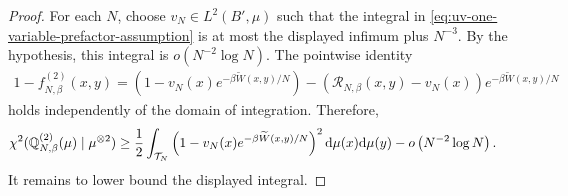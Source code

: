 \documentclass[11pt,reqno]{amsart}
\numberwithin{equation}{section}
\theoremstyle{plain}
\theoremstyle{remark}
\DeclarePairedDelimiter{\pa}{\lparen}{\rparen}
\newcommand{\md}{\mathrm{d}}
\newcommand{\Q}{{\mathbb{Q}}}
\newcommand{\tl}{\widetilde}
\newcommand{\be}{\beta}
\newcommand{\Chi}{\chi^2}
\begin{document}
\begin{proof}
For each \(N\), choose \(v_N\in L^2(B',\mu)\) such that the integral in \eqref{eq:uv-one-variable-prefactor-assumption} is at most the displayed infimum plus \(N^{-3}\).  By the hypothesis, this integral is \(o(N^{-2}\log N)\).  The pointwise identity
\begin{align}\label{eq:uv-critical-one-variable-decomposition}
 1-f_{N,\be}^{(2)}(x,y)
 =\left(1-v_N(x)e^{-\be\tl W(x,y)/N}\right)
 -\left(\mathcal R_{N,\be}(x,y)-v_N(x)\right)
 e^{-\be\tl W(x,y)/N}
\end{align}
holds independently of the domain of integration.  Therefore,
\begin{align}\label{eq:uv-critical-reduction-to-main-integral}
 \Chi\pa{\Q_{N,\be}^{(2)}(\mu)\mid\mu^{\otimes2}}
 &\ge\frac12
 \int_{\mathcal T_N}
 \left(1-v_N(x)e^{-\be\tl W(x,y)/N}\right)^2
 \md\mu(x)\md\mu(y)
 -o\left(N^{-2}\log N\right).
\end{align}
It remains to lower bound the displayed integral.


\end{proof}
\end{document}
